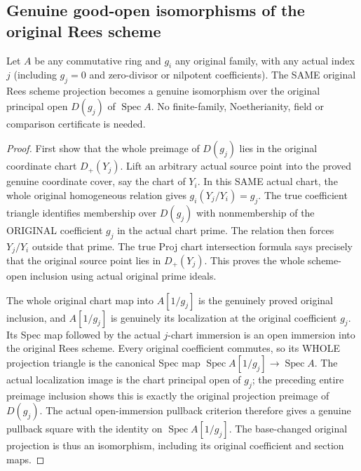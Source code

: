 \subsection{Genuine good-open isomorphisms of the original Rees scheme}
\begin{theorem}
\label{scheme:actual-rees-good-open-isomorphism}
\leanok
{}
Let $A$ be any commutative ring and $g_i$ any original family, with any actual
index $j$ (including $g_j=0$ and zero-divisor or nilpotent coefficients). The SAME original Rees scheme projection becomes a
genuine isomorphism over the original principal open $D(g_j)$ of
$\operatorname{Spec}A$. No finite-family, Noetherianity, field or comparison
certificate is needed.
\end{theorem}
\begin{proof}
First show that the whole preimage of $D(g_j)$ lies in the original coordinate
chart $D_+(Y_j)$. Lift an arbitrary actual source point into the proved genuine
coordinate cover, say the chart of $Y_i$. In this SAME actual chart,
the whole original homogeneous relation gives
$g_i(Y_j/Y_i)=g_j$. The true coefficient triangle identifies membership over
$D(g_j)$ with nonmembership of the ORIGINAL coefficient $g_j$ in the actual
chart prime. The relation then forces $Y_j/Y_i$ outside that prime. The true
Proj chart intersection formula says precisely that the original source
point lies in $D_+(Y_j)$. This proves the whole scheme-open inclusion using
actual original prime ideals.

The whole original chart map into $A[1/g_j]$ is the genuinely proved original
inclusion, and $A[1/g_j]$ is genuinely its localization at the original
coefficient $g_j$. Its Spec map followed by the actual $j$-chart immersion
is an open immersion into the original Rees scheme. Every original
coefficient commutes, so its WHOLE projection triangle is the canonical
Spec map $\operatorname{Spec}A[1/g_j]\to\operatorname{Spec}A$.
The actual localization image is the chart principal open of $g_j$; the
preceding entire preimage inclusion shows this is exactly the original
projection preimage of $D(g_j)$. The actual open-immersion pullback criterion
therefore gives a genuine pullback square with the identity on
$\operatorname{Spec}A[1/g_j]$. The base-changed original projection is thus
an isomorphism, including its original coefficient and section maps.
\end{proof}
